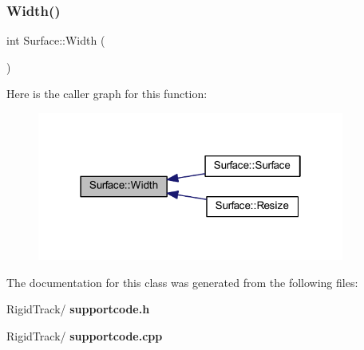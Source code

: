 \subsubsection{Width()}
{\footnotesize\ttfamily int Surface\+::\+Width (\begin{DoxyParamCaption}{ }\end{DoxyParamCaption})\hspace{0.3cm}{\ttfamily [inline]}}

Here is the caller graph for this function\+:\nopagebreak
\begin{figure}[H]
\begin{center}
\leavevmode
\includegraphics[width=286pt]{class_surface_ae76d7c2fa208df6979a77cc60e8105c0_icgraph}
\end{center}
\end{figure}


The documentation for this class was generated from the following files\+:\begin{DoxyCompactItemize}
\item 
Rigid\+Track/\textbf{ supportcode.\+h}\item 
Rigid\+Track/\textbf{ supportcode.\+cpp}\end{DoxyCompactItemize}
